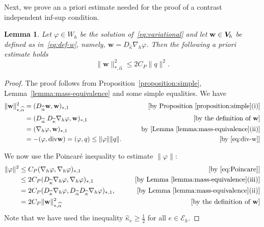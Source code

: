 \documentclass[11pt]{amsart}
\numberwithin{equation}{section}
\newtheorem{lemma}{Lemma}[section]
\theoremstyle{definition}\newtheorem{example}{Example}[section]
\begin{document}
Next, we prove an a priori estimate needed for the proof of a contrast
independent inf-sup condition.
\begin{lemma}\label{lemma:a-priori}
  Let $\varphi\in W_h$ be the solution of~\eqref{eq:variational} and
  let ${{\mathbf w}} \in {{\boldsymbol V}_{\hspace{-0.2mm}h}}$ be defined as in~\eqref{eq:def-w}, namely, 
  ${{\mathbf w}} =D_{\widehat{\kappa}}\nabla_h\varphi$. Then the following 
\emph{a  priori} estimate holds
\begin{equation}\label{eq:a-priori}
\|{{\mathbf w}}\|^2_{*,\widehat{\alpha}} \le 2C_P\|q\|^2.
\end{equation}
\end{lemma}
\begin{proof}
The proof follows from Proposition~\ref{proposition:simple}, 
Lemma~\ref{lemma:mass-equivalence} and some simple equalities. We have
\begin{equation*}
\begin{aligned}
\|{{\mathbf w}}\|^2_{*,\widehat{\alpha}}& =  
(D_{\widehat{\alpha}}{{\mathbf w}},{{\mathbf w}})_{*,1} 
&\qquad\mbox{[by Proposition~\ref{proposition:simple}(i)]}\\
& = 
(D_{\widehat{\alpha}}\;D_{\widehat{\kappa}}\nabla_h\varphi,{{\mathbf w}})_{*,1}
& \qquad\mbox{[by the definition of ${{\mathbf w}}$]}
\\
& =   (\nabla_h\varphi,{{\mathbf w}})_{*,1}
&\qquad \mbox{by [Lemma~\ref{lemma:mass-equivalence}(ii)]}\\
&=  -(\varphi,{\operatorname{div}} {{\mathbf w}})=(\varphi, q) \le  \|\varphi\|\|q\|. 
&\qquad\mbox{[by~\eqref{eq:div-w}]}
\end{aligned}
\end{equation*}

We now use the {Poincar\'e } inequality to estimate $\|\varphi\|$:
\begin{equation*}
\begin{aligned}
\|\varphi\|^2 &\le C_P(\nabla_h\varphi,\nabla_h\varphi)_{*,1} 
&\qquad\mbox{[by \eqref{eq:Poincare}]}\\
&\le 2C_P(D_{\widehat{\kappa}}\nabla_h\varphi,\nabla_h\varphi)_{*,1}
&\qquad\mbox{[by Lemma~\ref{lemma:mass-equivalence}(iii)]}\\
&=
2C_P(D_{\widehat{\kappa}}\nabla_h\varphi,D_{\widehat{\alpha}}D_{\widehat{\kappa}}
  \nabla_h\varphi)_{*,1},
&\qquad\mbox{[by Lemma~\ref{lemma:mass-equivalence}(ii)]}\\
& =  2C_P\|{{\mathbf w}}\|^2_{*,\widehat{\alpha}} 
& \qquad\mbox{[by the definition of ${{\mathbf w}}$]}
\end{aligned}
\end{equation*}
Note that  we have used the inequality  
$\widehat{\kappa}_e\ge \frac12$ for all $e\in \mathcal{E}_h$. 
\end{proof}
\end{document}

